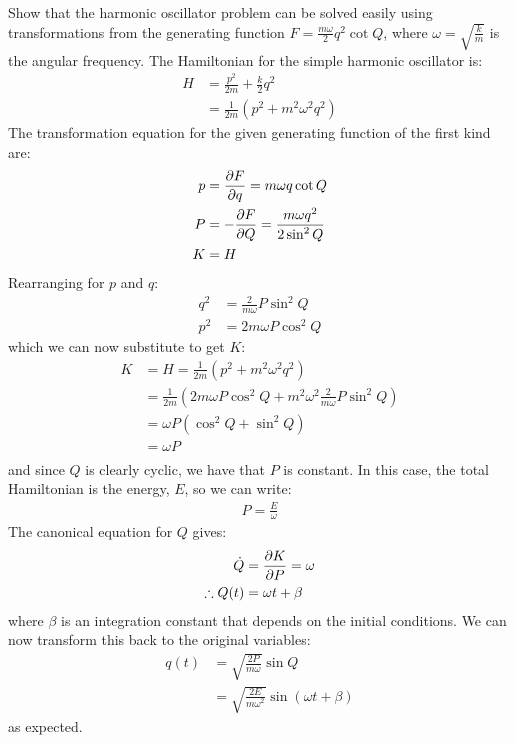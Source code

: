 \begin{example}{0pt}{Show that the harmonic oscillator problem can be solved easily using transformations from the generating function $F=\frac{m\omega}{2}q^2\cot Q$, where $\omega=\sqrt{\frac{k}{m}}$ is the angular frequency.}{}
The Hamiltonian for the simple harmonic oscillator is:
\begin{align*}
H&=\frac{p^2}{2m}+\frac{k}{2}q^2\\
&=\frac{1}{2m}(p^2+m^2\omega^2q^2)
\end{align*}
The transformation equation for the given generating function of the first kind are:
\begin{align*}
p&=\frac{\partial F}{\partial q}=m\omega q\cot Q \\
P&=-\frac{\partial F}{\partial Q}=\frac{m\omega q^2}{2\sin^2 Q}\\
K&=H
\end{align*}
Rearranging for $p$ and $q$:
\begin{align*}
q^2&=\frac{2}{m\omega}P\sin^2Q\\
p^2&=2m\omega P\cos^2Q
\end{align*}
which we can now substitute to get $K$:
\begin{align*}
K&=H=\frac{1}{2m}(p^2+m^2\omega^2q^2)\\
&=\frac{1}{2m}\left(2m\omega P\cos^2Q +m^2\omega^2\frac{2}{m\omega}P\sin^2Q  \right)\\
&=\omega P(\cos^2Q+\sin^2Q)\\
&=\omega P\\
\end{align*}
and since $Q$ is clearly cyclic, we have that $P$ is constant. In this case, the total Hamiltonian is the energy, $E$, so we can write:
\begin{align*}
P=\frac{E}{\omega}
\end{align*}
The canonical equation for $Q$ gives:
\begin{align*}
\dot Q&=\frac{\partial K}{\partial P}=\omega\\
\therefore Q(t)&=\omega t +\beta
\end{align*}
where $\beta$ is an integration constant that depends on the initial conditions. We can now transform this back to the original variables:
\begin{align*}
q(t)&=\sqrt{\frac{2P}{m\omega}}\sin Q\\
&=\sqrt{\frac{2E}{m\omega^2}}\sin(\omega t +\beta)
\end{align*}
as expected.

\end{example}

